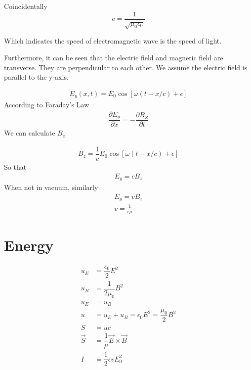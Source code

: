 Coincidentally
\begin{equation}
  c = \dfrac{1}{\sqrt{\mu_{0} \epsilon_{0}}} 
\end{equation}

Which indicates the speed of electromagnetic wave is the speed of light.

Furthermore, it can be seen that the electric field and magnetic field are transverse. They are perpendicular to each other. We assume the electric field is parallel to the y-axis.

\begin{equation}
  \begin{aligned}
    E_{y} (x,t) = E_{0} \cos \left[ \omega \left( t - x/c  \right) + \epsilon \right]
  \end{aligned}
\end{equation}
According to Faraday's Law
\begin{equation}
  \begin{aligned}
    \dfrac{\partial E_{y}}{\partial x} = - \dfrac{\partial B_{Z}}{\partial t}  
  \end{aligned}
\end{equation}
We can calculate $B_{z}$

\begin{equation}
  \begin{aligned}
    B_z = \dfrac{1}{c} E_{0} \cos \left[ \omega \left( t - x/c  \right) + \epsilon \right]
  \end{aligned}
\end{equation}
So that
\begin{equation}
  \begin{aligned}
    E_y = c B_z
  \end{aligned}
\end{equation}
When not in vacuum, similarly
\begin{equation}
  \begin{aligned}
    E_y=vB_z \\
    v=\frac{1}{\epsilon\mu}
  \end{aligned}
\end{equation}

\section{Energy}

\begin{equation}
  \begin{aligned}
    u_{E} &= \dfrac{\epsilon_{0}}{2} E^{2} \\
    u_{B} &= \dfrac{1}{2\mu_{0}} B^{2} \\
    u_{E} &= u_{B} \\
    u &= u_{E} + u_{B} = \epsilon_{0} E^{2} = \dfrac{\mu_{0}}{2} B^{2} \\ 
    S &= uc \\
    \vec{S} &= \dfrac{1}{\mu} \vec{E} \times \vec{B} \\
    I &= \dfrac{1}{2} \epsilon v E_0^2
  \end{aligned}
\end{equation}

